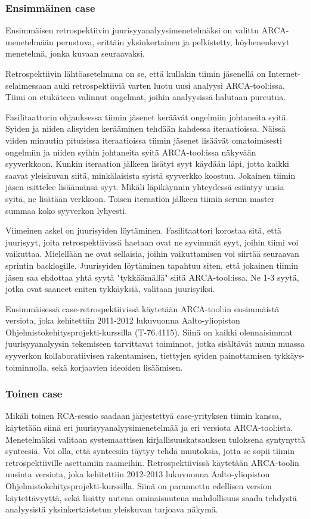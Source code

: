 \subsubsection{Ensimmäinen case}
Ensimmäisen retrospektiivin juurisyyanalyysimenetelmäksi on valittu ARCA-menetelmään perustuva, erittäin yksinkertainen ja pelkistetty,  höyhenenkevyt menetelmä, jonka kuvaan seuraavaksi.

Retrospektiivin lähtöasetelmana on se, että kullakin tiimin jäsenellä on Internet-selaimessaan auki retrospektiiviä varten luotu uusi analyysi ARCA-tool:issa. Tiimi on etukäteen valinnut ongelmat, joihin analyysissä halutaan pureutua.

Fasilitaattorin ohjauksessa tiimin jäsenet keräävät ongelmiin johtaneita syitä. Syiden ja niiden alisyiden kerääminen tehdään kahdessa iteraatioissa. Näissä viiden minuutin pituisissa iteraatioissa tiimin jäsenet lisäävät omatoimisesti ongelmiin ja niiden syihin johtaneita syitä ARCA-tool:issa näkyvään syyverkkoon. Kunkin iteraation jälkeen lisätyt syyt käydään läpi, jotta kaikki saavat yleiskuvan siitä, minkälaisista syistä syyverkko koostuu. Jokainen tiimin jäsen esittelee lisäämänsä syyt. Mikäli läpikäynnin yhteydessä esiintyy uusia syitä, ne lisätään verkkoon. Toisen iteraation jälkeen tiimin scrum master summaa koko syyverkon lyhyesti. 

Viimeinen askel on juurisyiden löytäminen. Fasilitaattori korostaa sitä, että juurisyyt, joita retrospektiivissä haetaan ovat ne syvimmät syyt, joihin tiimi voi vaikuttaa. Mielellään ne ovat sellaisia, joihin vaikuttamisen voi siirtää seuraavan sprintin backlogille. Juurisyiden löytäminen tapahtuu siten, että jokainen tiimin jäsen saa ehdottaa yhtä syytä "tykkäämällä" siitä ARCA-tool:issa. Ne 1-3 syytä, jotka ovat saaneet eniten tykkäyksiä, valitaan juurisyiksi.

Ensimmäisessä case-retrospektiivissä käytetään ARCA-tool:in ensimmäistä versiota, joka kehitettiin 2011-2012 lukuvuonna Aalto-yliopiston Ohjelmistokehitysprojekti-kurssilla (T-76.4115). Siinä on kaikki olennaisimmat juurisyyanalyysin tekemiseen tarvittavat toiminnot, jotka sisältävät muun muassa syyverkon kollaboratiivisen rakentamisen, tiettyjen syiden painottamisen tykkäys-toiminnolla, sekä korjaavien ideoiden lisäämisen.

\subsubsection{Toinen case}
Mikäli toinen RCA-sessio saadaan järjestettyä case-yrityksen tiimin kanssa, käytetään siinä eri juurisyyanalyysimenetelmää ja eri versiota ARCA-tool:ista. Menetelmäksi valitaan systemaattisen kirjallisuuskatsauksen tuloksena syntynyttä synteesiä. Voi olla, että synteesiin täytyy tehdä muutoksia, jotta se sopii tiimin retrospektiiville asettamiin raameihin. Retrospektiivissä käytetään ARCA-toolin uusinta versiota, joka kehitettiin 2012-2013 lukuvuonna Aalto-yliopiston Ohjelmistokehitysprojekti-kurssilla. Siinä on parannettu edellisen version käytettävyyttä, sekä lisätty uutena ominaisuutena mahdollisuus saada tehdystä analyysistä yksinkertaistetun yleiskuvan tarjoava näkymä.

